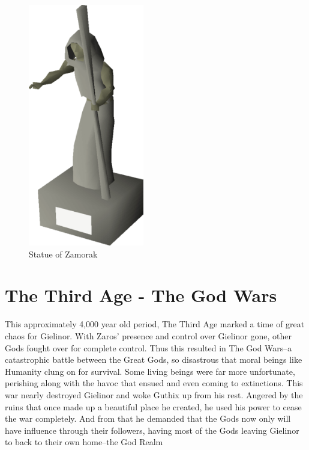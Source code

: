 \documentclass{article}
\begin{document}
\newpage
\begin{figure}
\includegraphics[width=0.45\textwidth]{zamorak.png}
\caption*{\label{fig:zam}Statue of Zamorak}
\end{figure} 
\section{The Third Age - The God Wars}
This approximately 4,000 year old period, The Third Age marked a time of great chaos for Gielinor. With Zaros' presence and control over Gielinor gone, other Gods fought over for complete control. Thus this resulted in The God Wars--a catastrophic battle between the Great Gods, so disastrous that moral beings like Humanity clung on for survival. Some living beings were far more unfortunate, perishing along with the havoc that ensued and even coming to extinctions. This war nearly destroyed Gielinor and woke Guthix up from his rest. Angered by the ruins that once made up a beautiful place he created, he used his power to cease the war completely. And from that he demanded that the Gods now only will have influence through their followers, having most of the Gods leaving Gielinor to back to their own home--the God Realm
\end{document}
